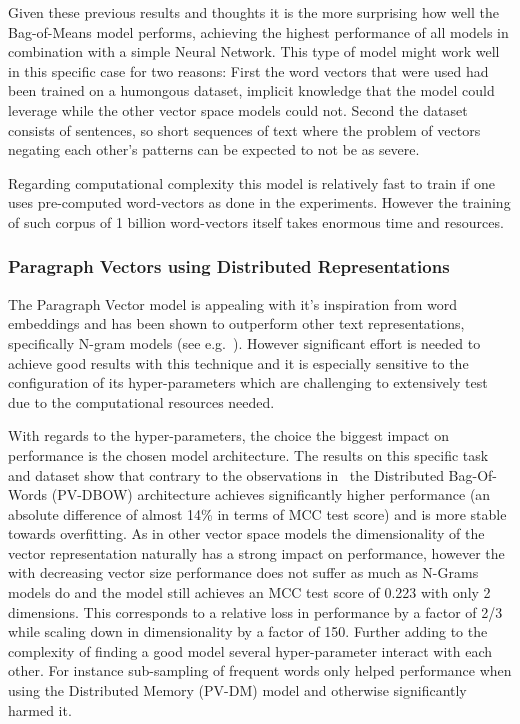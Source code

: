 Given these previous results and thoughts it is the more surprising how well the Bag-of-Means model performs, achieving the highest performance of all models in combination with a simple \gls{Neural Network}. This type of model might work well in this specific case for two reasons:
First the word vectors that were used had been trained on a humongous dataset, implicit knowledge that the model could leverage while the other vector space models could not. Second the dataset consists of sentences, so short sequences of text where the problem of vectors negating each other's patterns can be expected to not be as severe.

Regarding computational complexity this model is relatively fast to train if one uses pre-computed word-vectors as done in the experiments. However the training of such corpus of 1 billion word-vectors itself takes enormous time and resources.

\subsubsection{Paragraph Vectors using Distributed Representations}

The Paragraph Vector model is appealing with it's inspiration from word embeddings and has been shown to outperform other text representations, specifically N-gram models (see e.g.~\cite{Le:2014aa}). However significant effort is needed to achieve good results with this technique and it is especially sensitive to the configuration of its hyper-parameters which are challenging to extensively test due to the computational resources needed.

With regards to the hyper-parameters, the choice the biggest impact on performance is the chosen model architecture. The results on this specific task and dataset show that contrary to the observations in~\cite{Le:2014aa} the Distributed Bag-Of-Words (PV-DBOW) architecture achieves significantly higher performance (an absolute difference of almost 14\% in terms of \gls{MCC} test score) and is more stable towards overfitting.
As in other vector space models the dimensionality of the vector representation naturally has a strong impact on performance, however the with decreasing vector size performance does not suffer as much as N-Grams models do and the model still achieves an \gls{MCC} test score of 0.223 with only 2 dimensions. This corresponds to a relative loss in performance by a factor of 2/3 while scaling down in dimensionality by a factor of 150. Further adding to the complexity of finding a good model several hyper-parameter interact with each other. For instance sub-sampling of frequent words only helped performance when using the Distributed Memory (PV-DM) model and otherwise significantly harmed it.


